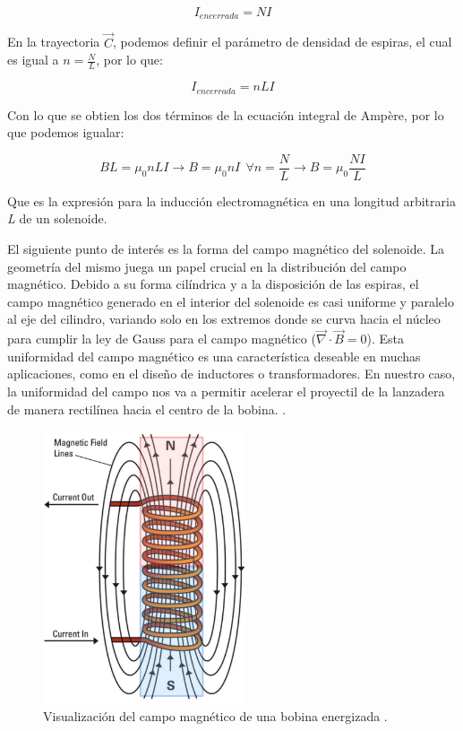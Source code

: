 \begin{center}
    \[I_{encerrada} = NI\]
\end{center}

En la trayectoria \(\vec{C}\), podemos definir el parámetro de densidad de espiras, el cual es igual a \(n=\frac{N}{L}\), por lo que:

\begin{center}
    \[I_{encerrada} = nLI\]
\end{center}

Con lo que se obtien los dos términos de la ecuación integral de Ampère, por lo que podemos igualar:

\begin{center}
    \[BL=\mu_0nLI\to B=\mu_0nI~~\forall n=\frac{N}{L}\to B=\mu_0\frac{NI}{L}\]
\end{center}

Que es la expresión para la inducción electromagnética en una longitud arbitraria \textit{L} de un solenoide.

El siguiente punto de interés es la forma del campo magnético del solenoide. La geometría del mismo juega un papel crucial en la distribución del campo magnético. Debido a su forma cilíndrica y a la disposición de las espiras, el campo magnético generado en el interior del solenoide es casi uniforme y paralelo al eje del cilindro, variando solo en los extremos donde se curva hacia el núcleo para cumplir la ley de Gauss para el campo magnético (\(\vec{\nabla}\cdot\vec{B} = 0\)). Esta uniformidad del campo magnético es una característica deseable en muchas aplicaciones, como en el diseño de inductores o transformadores. En nuestro caso, la uniformidad del campo nos va a permitir acelerar el proyectil de la lanzadera de manera rectilínea hacia el centro de la bobina.\citep{purcell2013electricidad} \citep{griffiths2005}\citep{tipler2008}.

\begin{figure}[H]
    \centering %
    \includegraphics[width=6cm]{FigurasMemoria/electromagnet.png}
    \caption{Visualización del campo magnético de una bobina energizada \citep{northeastern2024electromagnets}.}
    \label{fig:electromagnet} %
\end{figure}

